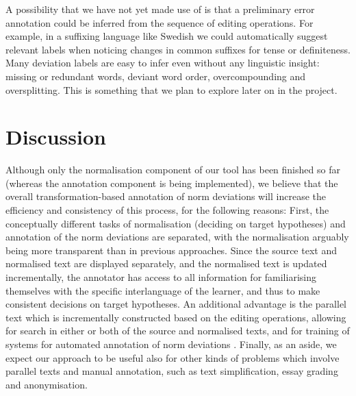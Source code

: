 \documentclass[10pt, a4paper]{article}
\newcommand{\dan}[1]{{\color{Fuchsia}{Dan: #1}}}
\newcommand{\elena}[1]{{\color{BrickRed}{Elena: #1}}}
\newcommand{\normAnn}[0]{our tool }
\begin{document}
A possibility that we have not yet made use of is that a preliminary error annotation could be inferred from the sequence of editing operations. For example, in a suffixing language like Swedish we could automatically
suggest relevant labels when noticing changes in common suffixes for tense
or definiteness.
Many deviation labels are easy to infer even without any linguistic
insight: missing or redundant words, deviant word order, overcompounding
and oversplitting.
This is something that we plan to explore later on in the project.


\section{Discussion}
\label{sec:discussion}


Although only the normalisation component of \normAnn has been finished so far (whereas the annotation component is being implemented), we believe that the overall transformation-based annotation of norm deviations
will increase the efficiency and consistency of this process, for the following reasons: %
First, the conceptually different tasks of normalisation (deciding on target hypotheses) and annotation of the norm deviations are separated, with the normalisation arguably being more transparent than in previous approaches. Since the source text and normalised text are displayed separately, and the normalised text is updated incrementally, the annotator has access to all information for familiarising themselves with the specific interlanguage of the learner, and thus to make consistent decisions on target hypotheses.
An additional advantage is the parallel text which is incrementally constructed based on the editing operations, allowing for search in either or both of the source and normalised texts, and for training of systems for automated annotation of norm deviations \cite{sproat2016rnn}.
Finally, as an aside, we expect our approach to be useful also for other kinds of problems which involve parallel texts and manual annotation, such as text simplification, %
 essay grading and anonymisation. %
\end{document}
